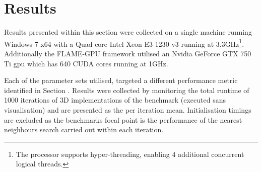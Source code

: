 \section{Results\label{sec:results}}
  Results presented within this section were collected on a single machine running Windows 7 x64 with a Quad core Intel Xeon E3-1230 v3 running at 3.3GHz\footnote{The processor supports hyper-threading, enabling 4 additional concurrent logical threads.}. Additionally the FLAME-GPU framework utilised an Nvidia GeForce GTX 750 Ti \gls{gpu} which has 640 CUDA cores running at 1GHz.
  
  Each of the parameter sets utilised, targeted a different performance metric identified in Section \label{sec:benchmark-model}. Results were collected by monitoring the total runtime of 1000 iterations of 3D implementations of the benchmark (executed sans visualisation) and are presented as the per iteration mean. Initialisation timings are excluded as the benchmarks focal point is the performance of the nearest neighbours search carried out within each iteration.
